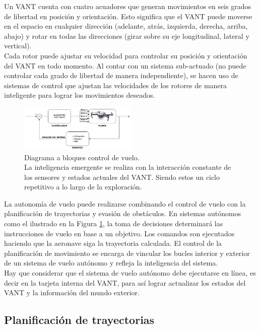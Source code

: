 \documentclass[sigconf]{acmart}
\begin{document}
Un VANT cuenta con cuatro acuadores que generan movimientos en seis grados de libertad en posición y orientación. Esto significa que el VANT puede moverse en el espacio en cualquier dirección (adelante, atrás, izquierda, derecha, arriba, abajo) y rotar en todas las direcciones (girar sobre su eje longitudinal, lateral y vertical).\\
Cada rotor puede ajustar su velocidad para controlar su posición y orientación del VANT en todo momento. Al contar con un sistema sub-actuado (no puede controlar cada grado de libertad de manera independiente), se hacen uso de sistemas de control  que ajustan las velocidades de los rotores de manera inteligente para lograr los movimientos deseados.

\begin{figure}[h]
\centering
\includegraphics[width=0.5\textwidth]{control_drone}
\caption{Diagrama a bloques control de vuelo. \\La inteligencia emergente se realiza con la interacción constante de los sensores y estados actuales del VANT. Siendo estos un ciclo repetitivo a lo largo de la exploración.}
\label{fig:bloque}
\end{figure}

La autonomía de vuelo puede realizarse combinando el control de vuelo con la planificación de trayectorias y evasión de obstáculos. En sistemas autónomos como el ilustrado en la Figura \ref{fig:bloque}, la toma de decisiones determinará las instrucciones de vuelo en base a un objetivo. Los comandos son ejecutados haciendo que la aeronave siga la trayectoria calculada. El control de la planificación de movimiento se encarga de vincular los bucles interior y exterior de un sistema de vuelo autónomo y refleja la inteligencia del sistema.\\

Hay que considerar que el sistema de vuelo autónomo debe ejecutarse en línea, es decir en la tarjeta interna del VANT, para así lograr actualizar los estados del VANT y la información del mundo exterior.

\subsection*{Planificación de trayectorias}
\end{document}
